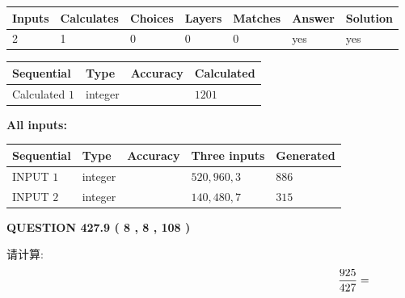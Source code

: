 \documentclass{ctexart}
\begin{document}
   
   
   
\noindent\begin{tabular}{|l|l|l|l|l|l|l|}
 \hline
Inputs & Calculates & Choices & Layers & Matches & Answer & Solution \\ \hline
 2  & 
 1  & 
 0
  & 
 0  & 
 0  & 
  yes & 
  yes 
  \\ \hline
 \end{tabular}
   
   
   
   
\noindent{}
   
   
  
  
\noindent\begin{tabular}{|l|l|l|l|}
\hline
 Sequential & Type & Accuracy & Calculated \\ 
\hline
 
 
  Calculated $  1 $ & integer &  & 
  $ 1201 $ 
 \\  \hline  
 \end{tabular}
   
   
   
   
\noindent\vspace{0.1in}\hspace{-0.08in} {\textbf{\Large{All inputs: }}}
   
   
  
  
\noindent\begin{tabular}{|l|l|l|l|l|}
\hline
 Sequential & Type & Accuracy & Three inputs & Generated \\ 
\hline
 
 
  INPUT $  1 $ & integer &  & $
 520
 , 
 960
 , 
 3
 $ & $ 886 $ 
 \\  \hline  
 
 
  INPUT $  2 $ & integer &  & $
 140
 , 
 480
 , 
 7
 $ & $ 315 $ 
 \\  \hline  
 \end{tabular}
   
   
  
\vspace{0.2in}
  
{\textbf{\Large{QUESTION
427.9 
 ( 8 , 8 , 108 )
}}}
  
  
 
请计算:
\begin{equation}
\frac { %
925 }  {  %
427} = \nonumber
\end{equation}
 
 
 
\end{document}
